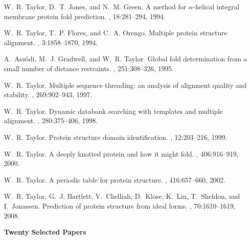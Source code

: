 \begin{thebibliography}{100}
W.~R. Taylor, D.~T. Jones, and N.~M. Green.
\newblock A method for $\alpha$-helical integral membrane protein fold
  prediction.
, 18:281--294, 1994.

W.~R. Taylor, T.~P. Flores, and C.~A. Orengo.
\newblock Multiple protein structure alignment.
, 3:1858--1870, 1994.

A.~Asz\'{o}di, M.~J. Gradwell, and W.~R. Taylor.
\newblock Global fold determination from a small number of distance restraints.
, 251:308--326, 1995.

W.~R. Taylor.
\newblock Multiple sequence threading: an analysis of alignment quality and
  stability.
, 269:902--943, 1997.

W.~R. Taylor.
\newblock Dynamic databank searching with templates and multiple alignment.
, 280:375--406, 1998.
 

W.~R. Taylor.
\newblock Protein structure domain identification.
, 12:203--216, 1999.

W.~R. Taylor.
\newblock A deeply knotted protein and how it might fold.
, 406:916--919, 2000.

W.~R. Taylor.
\newblock A periodic table for protein structure.
, 416:657--660, 2002.

W.~R. Taylor, G.~J. Bartlett, V.~Chelliah, D.~Klose, K.~Lin, T.~Sheldon, and
  I.~Jonassen.
\newblock Prediction of protein structure from ideal forms.
, 70:1610--1619, 2008.

\huge \bf Twenty Selected Papers

\end{thebibliography}  
